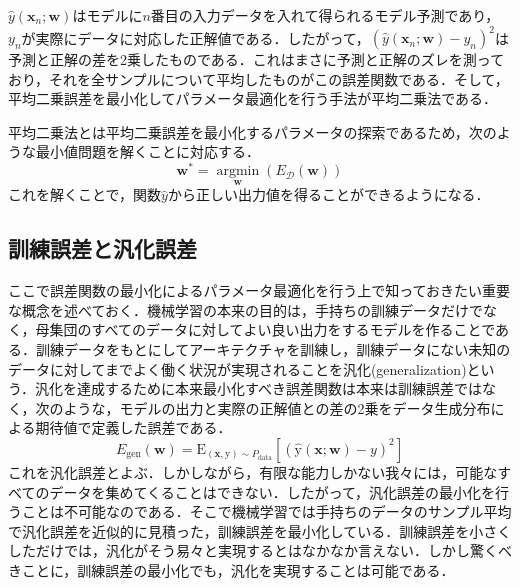\documentclass[a4paper,11pt]{jsreport}
\begin{document}
$\hat{y}(\bm{x}_n; \bm{w})$はモデルに$n$番目の入力データを入れて得られるモデル予測であり，$y_n$が実際にデータに対応した正解値である．したがって，$(\hat{y}(\bm{x}_n; \bm{w}) - y_n)^2$は予測と正解の差を2乗したものである．これはまさに予測と正解のズレを測っており，それを全サンプルについて平均したものがこの誤差関数である．そして，平均二乗誤差を最小化してパラメータ最適化を行う手法が平均二乗法である．\par
平均二乗法とは平均二乗誤差を最小化するパラメータの探索であるため，次のような最小値問題を解くことに対応する．
\begin{equation}
  \bm{w}^* = \underset{\bm{w}} {\operatorname{argmin}} (E_{\mathcal{D}}(\bm{w}))
\end{equation}
これを解くことで，関数$\hat{y}$から正しい出力値を得ることができるようになる．
\subsection{訓練誤差と汎化誤差}
ここで誤差関数の最小化によるパラメータ最適化を行う上で知っておきたい重要な概念を述べておく．機械学習の本来の目的は，手持ちの訓練データだけでなく，母集団のすべてのデータに対してよい良い出力をするモデルを作ることである．訓練データをもとにしてアーキテクチャを訓練し，訓練データにない未知のデータに対してまでよく働く状況が実現されることを汎化(generalization)という．汎化を達成するために本来最小化すべき誤差関数は本来は訓練誤差ではなく，次のような，モデルの出力と実際の正解値との差の2乗をデータ生成分布による期待値で定義した誤差である．
\begin{equation}
  E_{\text{gen}}(\bm{w}) 
  = \mathrm{E}_{(\mathbf{x}, \mathrm{y}) \sim P_{\text{data}}} \left[ (\hat{\mathrm{y}}(\mathbf{x}; \bm{w}) - y)^2 \right]
\end{equation}
これを汎化誤差とよぶ．しかしながら，有限な能力しかない我々には，可能なすべてのデータを集めてくることはできない．したがって，汎化誤差の最小化を行うことは不可能なのである．そこで機械学習では手持ちのデータのサンプル平均で汎化誤差を近似的に見積った，訓練誤差を最小化している．訓練誤差を小さくしただけでは，汎化がそう易々と実現するとはなかなか言えない．しかし驚くべきことに，訓練誤差の最小化でも，汎化を実現することは可能である．
\end{document}

